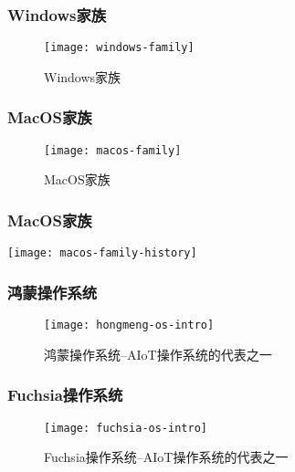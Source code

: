 \begin{frame}
	
	\frametitle{Windows家族}
	
	\begin{figure}
		\centering
		\texttt{[image: windows-family]}
		\caption{Windows家族}
	\end{figure}
	
\end{frame}
\begin{frame}
	
	\frametitle{MacOS家族}
	
	\begin{figure}
		\centering
		\texttt{[image: macos-family]}
		\caption{MacOS家族}
	\end{figure}
	
\end{frame}
\begin{frame}
	
	\frametitle{MacOS家族}
	
		\texttt{[image: macos-family-history]}
	
\end{frame}

\begin{frame}
	\frametitle{鸿蒙操作系统}
	
	\begin{figure}
		\centering
		\texttt{[image: hongmeng-os-intro]}
		\caption{鸿蒙操作系统--AIoT操作系统的代表之一}
	\end{figure}
	
\end{frame}


\begin{frame}
	\frametitle{Fuchsia操作系统}
	
	\begin{figure}
		\centering
		\texttt{[image: fuchsia-os-intro]}
		\caption{Fuchsia操作系统--AIoT操作系统的代表之一}
	\end{figure}
	
\end{frame}


